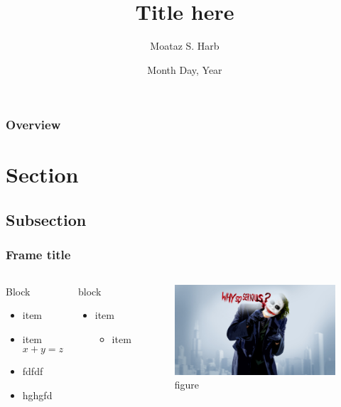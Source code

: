 \documentclass[10pt]{beamer}
\title{Title here}
\author{Moataz S. Harb}
\institute[UWMadison]
{
Department of Engineering Physics \\
\medskip
}
\date{Month Day, Year}
\begin{document}
\begin{frame}
\titlepage
\end{frame}

\begin{frame}
\frametitle{Overview}
\tableofcontents[hideallsubsections]
\end{frame}


\section{Section}

\subsection{Subsection}
\begin{frame}
\frametitle{Frame title}
\begin{columns}[c]
\begin{block}{Block}
\begin{itemize}
\item item \cite{paper}
\item item
\begin{equation*}
x + y = z
\end{equation*}
\item fdfdf
\item hghgfd 
\end{itemize}
\end{block}
\begin{block}{block}
\begin{itemize}
\item item 
\begin{itemize}
\item item
\end{itemize}
\end{itemize}
\end{block}
\begin{figure}
\includegraphics[scale=0.06]{figures/joker.jpg}
\caption{figure \cite{paper}}
\end{figure}
\end{columns}
\end{frame}
\end{document}
